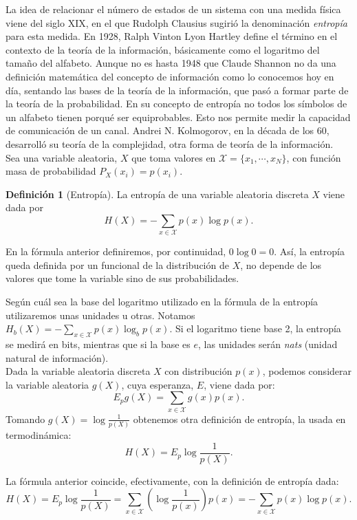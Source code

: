\documentclass[10pt,a4paper]{article} %
\theoremstyle{definition}
\newtheorem{definition}{Definición}[section]
\begin{document}
    La idea de relacionar el número de estados de un sistema con una medida física viene del siglo XIX, en el que Rudolph Clausius sugirió la denominación \textit{entropía} para esta medida. En 1928, Ralph Vinton Lyon Hartley define el término en el contexto de la teoría de la información, básicamente como el logaritmo del tamaño del alfabeto. Aunque no es hasta 1948 que Claude Shannon no da una definición matemática del concepto de información como lo conocemos hoy en día,  sentando las bases de la teoría de la información, que pasó a formar parte de la teoría de la probabilidad. En su concepto de entropía no todos los símbolos de un alfabeto tienen porqué ser equiprobables. Esto nos permite medir la capacidad de comunicación de un canal. Andrei N. Kolmogorov, en la década de los 60, desarrolló su teoría de la complejidad, otra forma de teoría de la información.\\

Sea una variable aleatoria, $X$ que toma valores en $\mathcal{X} = \{x_1, \cdots, x_N \}$, con función masa de probabilidad $P_X(x_i) = p(x_i)$.

\begin{definition}[Entropía]
  La entropía de una variable aleatoria discreta $X$ viene dada por \[H(X) = - \sum_{x\in \mathcal{X}} p(x) \log p(x).\]
\end{definition}

En la fórmula anterior definiremos, por continuidad, $0 \log 0 = 0$. Así, la entropía queda definida por un funcional de la distribución de $X$, no depende de los valores que tome la variable sino de sus probabilidades.

Según cuál sea la base del logaritmo utilizado en la fórmula de la entropía utilizaremos unas unidades u otras. Notamos $H_b(X) = - \sum_{x\in \mathcal{X}} p(x) \log_b p(x)$. Si el logaritmo tiene base 2, la entropía se medirá en bits, mientras que si la base es $e$, las unidades serán \textit{nats} (unidad natural de información).\\

Dada la variable aleatoria discreta $X$ con distribución $p(x)$, podemos considerar la variable aleatoria $g(X)$, cuya esperanza, $E$, viene dada por:\[
E_pg(X) = \sum_{x\in \mathcal{X}}g(x)p(x).
\]
Tomando $g(X) = \log \frac{1}{p(X)}$ obtenemos otra definición de entropía, la usada en termodinámica:\[
H(X) = E_p \log \frac{1}{p(X)}.
\]

La fórmula anterior coincide, efectivamente, con la definición de entropía dada:\[
H(X) = E_p \log \frac{1}{p(X)} = \sum_{x\in \mathcal{X}}\left ( \log \frac{1}{p(x)} \right ) p(x) = - \sum_{x \in \mathcal{X}}p(x)\log p(x).
\]
\end{document}
